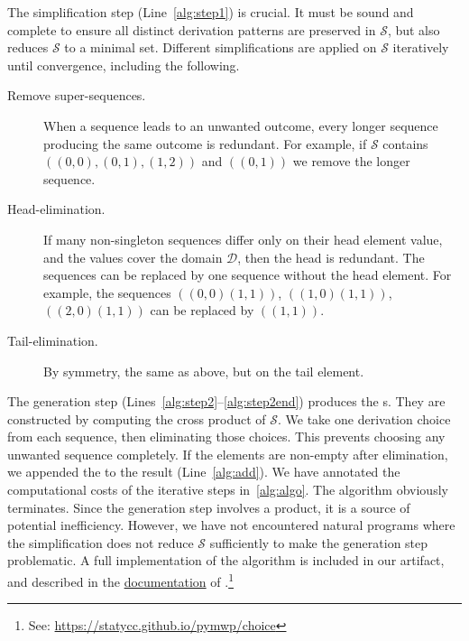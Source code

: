 The simplification step (Line~\ref{alg:step1}) is crucial.
It must be sound and complete to ensure all distinct derivation patterns are preserved in \(\mathcal{S}\),
but also reduces \(\mathcal{S}\) to a minimal set. %
Different simplifications are applied on \(\mathcal{S}\) iteratively until convergence, including the following.

\begin{description}

    \item[Remove super-sequences.] When a sequence leads to an unwanted outcome, every longer sequence producing the same outcome is redundant.
    For example, if \(\mathcal{S}\) contains \(((0,0),(0,1),(1,2))\) and \(((0,1))\) we remove the longer sequence.

    \item[Head-elimination.] If many non-singleton sequences differ only on their head element value, and the values cover the domain \(\mathcal{D}\), then the head is redundant.
    The sequences can be replaced by one sequence without the head element.
    For example, the sequences \(((0,0)(1,1))\), \(((1,0)(1,1))\), \(((2,0)(1,1))\) can be replaced by \(((1,1))\).

    \item[Tail-elimination.] By symmetry, the same as above, but on the tail element.

\end{description}

The generation step (Lines~\ref{alg:step2}--\ref{alg:step2end}) produces the s.
They are constructed by computing the cross product of \(\mathcal{S}\).
We take one derivation choice from each sequence, then eliminating those choices.
This prevents choosing any unwanted sequence completely.
If the  elements are non-empty after elimination, we appended the  to the result (Line~\ref{alg:add}).
We have annotated the computational costs of the iterative steps in~\autoref{alg:algo}.
The algorithm obviously terminates.
Since the generation step involves a product, it is a source of potential inefficiency.
However, we have not encountered natural programs where the simplification does not reduce \(\mathcal{S}\) sufficiently to make the generation step problematic.
A full implementation of the algorithm is included in our artifact, and described in the \href{https://statycc.github.io/pymwp/choice}{documentation} of .\footnote{See: \url{https://statycc.github.io/pymwp/choice}}

